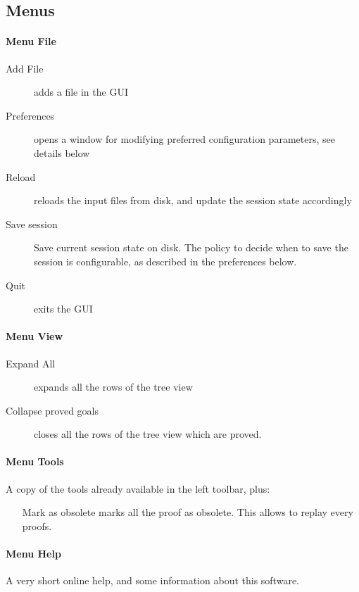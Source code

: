 \subsection{Menus}

\paragraph{Menu \textsf{File}}
\begin{description}
\item[Add File] adds a file in the GUI
\item[Preferences] opens a window for modifying preferred
  configuration parameters, see details below
\item[Reload] reloads the input files from disk, and update the session state accordingly
\item[Save session] Save current session state on disk. The policy to decide when to save the session is configurable, as described in the preferences below.
\item[Quit] exits the GUI
\end{description}

\paragraph{Menu \textsf{View}}
\begin{description}
\item[Expand All] expands all the rows of the tree view
\item[Collapse proved goals] closes all the rows of the tree view
  which are proved.
\end{description}

\paragraph{Menu \textsf{Tools}}
A copy of the tools already available in the left toolbar, plus:
\begin{itemize}
\item[Mark as obsolete] marks all the proof as obsolete. This allows to
  replay every proofs.
\end{itemize}

\paragraph{Menu \textsf{Help}}
A very short online help, and some information about this software.

